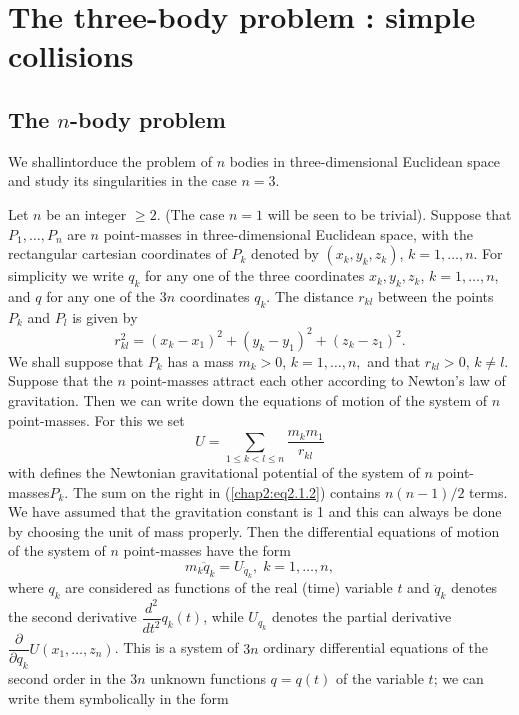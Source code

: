 
\chapter{The three-body problem : simple collisions}\label{chap2}

\section{The $n$-body problem}\label{chap2:sec1}

We shall\pageoriginale intorduce the problem of $n$ bodies in three-dimensional Euclidean space and study its singularities in the case $n=3$.

Let $n$ be an integer $\geq 2$. (The case $n=1$ will be seen to be trivial). Suppose that $P_1, \ldots, P_n$ are $n$ point-masses in three-dimensional Euclidean space, with the rectangular cartesian coordinates of $P_k$ denoted by $(x_k, y_k,z_k)$, $k=1, \ldots, n$. For simplicity we write $q_k$ for any one of the three coordinates $x_k, y_k , z_k$, $k=1,\ldots,n $, and $q$ for any one of the $3n$ coordinates $q_k$. The distance $r_{kl}$ between the points $P_k$ and $P_l$ is given by
\begin{equation*}
r^2_{kl} = (x_k - x_1)^2 + (y_k - y_1)^2 + (z_k - z_1)^2. \tag{2.1.1}\label{chap2:eq2.1.1} 
\end{equation*}
We shall suppose that $P_k$ has a mass $m_k > 0$, $k = 1, \ldots, n,$ and that $r_{kl} > 0$, $k \neq l$. Suppose that the $n$ point-masses attract each other according to Newton's law of gravitation. Then we can write down the equations of motion of the system of $n$ point-masses. For this we set
\begin{equation*}
U = \sum\limits_{1\leq k < l \leq n} \frac{m_k m_1}{r_{kl}} \tag{2.1.2}\label{chap2:eq2.1.2}  
\end{equation*}
with defines the Newtonian gravitational potential of the system of $n$ point-masses\pageoriginale $P_k$. The sum on the right in (\ref{chap2:eq2.1.2}) contains $n(n-1)/2$ terms. We have assumed that the gravitation constant is 1 and this can always be done by choosing the unit of mass properly. Then the differential equations of motion of the system of $n$ point-masses have the form
\begin{equation*}
m_k \ddot{q}_k = U_{\ddot{q}_k}, \; k = 1, \ldots, n , \tag{2.1.3}\label{chap2:eq2.1.3} 
\end{equation*}
where $q_k$ are considered as functions of the real (time) variable $t$ and $\ddot{q}_k$ denotes the second derivative $\dfrac{d^2}{dt^2} q_k(t)$, while $U_{q_k}$ denotes the partial derivative $\dfrac{\partial}{\partial q_k} U(x_1, \ldots, z_n)$. This is a system of $3n$ ordinary differential equations of the second order in the $3n$ unknown functions $q = q(t)$ of the variable $t$; we can write them symbolically in the form 
